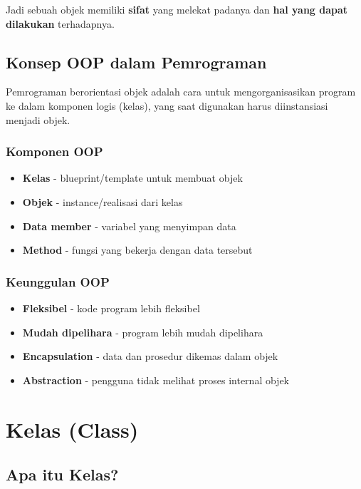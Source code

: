 Jadi sebuah objek memiliki \textbf{sifat} yang melekat padanya dan \textbf{hal yang dapat dilakukan} terhadapnya.

\subsection{Konsep OOP dalam Pemrograman}

Pemrograman berorientasi objek adalah cara untuk mengorganisasikan program ke dalam komponen logis (kelas), yang saat digunakan harus diinstansiasi menjadi objek.

\subsubsection{Komponen OOP}

\begin{itemize}
\item \textbf{Kelas} - blueprint/template untuk membuat objek
\item \textbf{Objek} - instance/realisasi dari kelas
\item \textbf{Data member} - variabel yang menyimpan data
\item \textbf{Method} - fungsi yang bekerja dengan data tersebut
\end{itemize}

\subsubsection{Keunggulan OOP}

\begin{itemize}
\item \textbf{Fleksibel} - kode program lebih fleksibel
\item \textbf{Mudah dipelihara} - program lebih mudah dipelihara
\item \textbf{Encapsulation} - data dan prosedur dikemas dalam objek
\item \textbf{Abstraction} - pengguna tidak melihat proses internal objek
\end{itemize}

\section{Kelas (Class)}\label{kelas}

\subsection{Apa itu Kelas?}

